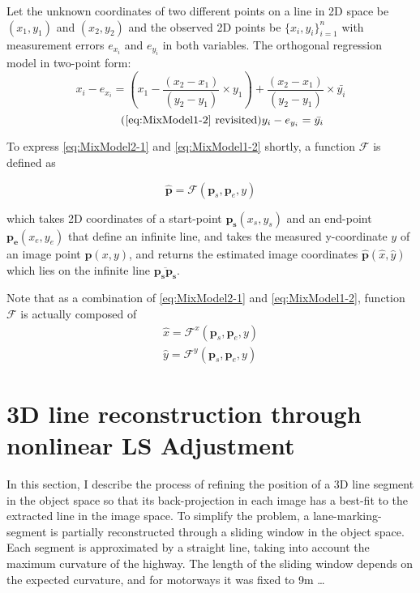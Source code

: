 Let the unknown coordinates of two different points on a line in 2D space be $(x_1,y_1)$ and $(x_2,y_2)$ and the observed 2D points be $\{x_i,y_i\}^n_{i=1}$ with measurement errors $e_{x_i}$ and $e_{y_i}$ in both variables. The orthogonal regression model in two-point form: 
\begin{equation} \label{eq:MixModel2-1}
x_i - e_{x_i}= (x_1-\dfrac{(x_2-x_1)}{(y_2-y_1)}\times y_1) + \dfrac{(x_2-x_1)}{(y_2-y_1)}\times \bar{y_i}
\end{equation}
\begin{equation} \tag{\ref{eq:MixModel1-2} revisited}
y_i-e_{y_i} = \bar{y_i}
\end{equation}

To express \eqref{eq:MixModel2-1} and \eqref{eq:MixModel1-2} shortly, a function $\mathcal{F}$ is defined as

\begin{equation} \label{eq:Ffunction}
\hat{\mathbf{p}} = \mathcal{F}(\mathbf{p}_s,\mathbf{p}_e,y)
\end{equation}

which takes 2D coordinates of a start-point $\mathbf{p_s}(x_s,y_s)$ and an end-point $\mathbf{p_e}(x_e,y_e)$ that define an infinite line, and takes the measured y-coordinate $y$ of an image point $\mathbf{p}(x,y)$, and returns the estimated image coordinates $\mathbf{\hat{p}}(\hat{x},\hat{y})$ which lies on the infinite line $\overline{\mathbf{p_s}\mathbf{p_s}}$.

Note that as a combination of \eqref{eq:MixModel2-1} and \eqref{eq:MixModel1-2}, function $\mathcal{F}$ is actually composed of
\begin{equation} \label{eq:Ffunction_xy}
\begin{split}
\hat{x} = \mathcal{F}^x(\mathbf{p}_s,\mathbf{p}_e,y)\\
\hat{y} = \mathcal{F}^y(\mathbf{p}_s,\mathbf{p}_e,y)
\end{split}
\end{equation}

\section{3D line reconstruction through nonlinear LS Adjustment}
\label{sec:LSadj}

In this section, I describe the process of refining the position of a 3D line segment in the object space so that its back-projection in each image has a best-fit to the extracted line in the image space. To simplify the problem, a lane-marking-segment is partially reconstructed through a sliding window in the object space. Each segment is approximated by a straight line, taking into account the maximum curvature of the highway. 
The length of the sliding window depends on the expected curvature, and for motorways it was fixed to 9m …


